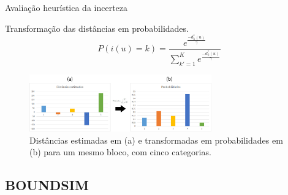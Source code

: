 \documentclass[aspectratio=169]{beamer}
\begin{document}
\begin{frame}{Avaliação heurística da incerteza}

Transformação das distâncias em probabilidades.
	\begin{equation}
	P(i(u)=k)=\frac{e^\frac{-d^*_k(u)}{\gamma}}{\sum_{k'=1}^{K}e^\frac{-d^*_k(u)}{\gamma}}
	\label{eq_softmax}
	\end{equation}
	
	\begin{figure}[H]
		\caption{\label{softmax_grafico}Distâncias estimadas em (a) e transformadas em probabilidades em (b) para um mesmo bloco, com cinco categorias.}
		\begin{center}
			\includegraphics[width=0.7\textwidth]{capitulo_2/softmax_bars_final.jpg}
		\end{center}
	\end{figure}
\end{frame}

\subsection{BOUNDSIM}
\end{document}
